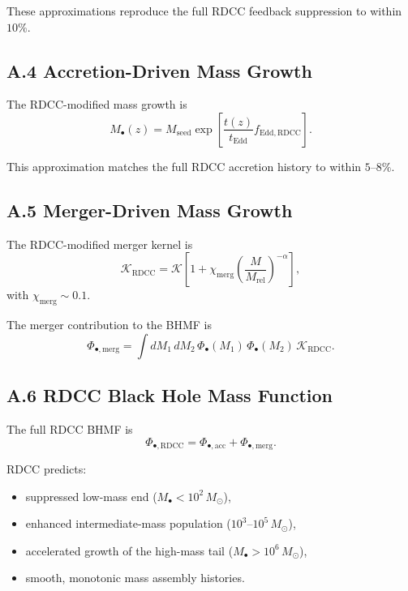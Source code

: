 \documentclass[11pt,a4paper]{article}
\begin{document}
These approximations reproduce the full RDCC feedback suppression to within $10\%$.

\subsection*{A.4 Accretion-Driven Mass Growth}

The RDCC-modified mass growth is
\begin{equation}
    M_{\bullet}(z)
    = M_{\mathrm{seed}}
      \exp\!\left[
        \frac{t(z)}{t_{\mathrm{Edd}}}
        f_{\mathrm{Edd,RDCC}}
      \right].
\end{equation}

This approximation matches the full RDCC accretion history to within $5$–$8\%$.

\subsection*{A.5 Merger-Driven Mass Growth}

The RDCC-modified merger kernel is
\begin{equation}
    \mathcal{K}_{\mathrm{RDCC}}
    = \mathcal{K}
      \left[
        1 + \chi_{\mathrm{merg}}
        \left(\frac{M}{M_{\mathrm{rel}}}\right)^{-\alpha}
      \right],
\end{equation}
with $\chi_{\mathrm{merg}} \sim 0.1$.

The merger contribution to the BHMF is
\begin{equation}
    \Phi_{\bullet,\mathrm{merg}}
    = \int dM_{1}\, dM_{2}\,
      \Phi_{\bullet}(M_{1})\,
      \Phi_{\bullet}(M_{2})\,
      \mathcal{K}_{\mathrm{RDCC}}.
\end{equation}

\subsection*{A.6 RDCC Black Hole Mass Function}

The full RDCC BHMF is
\begin{equation}
    \Phi_{\bullet,\mathrm{RDCC}}
    = \Phi_{\bullet,\mathrm{acc}}
    + \Phi_{\bullet,\mathrm{merg}}.
\end{equation}

RDCC predicts:

\begin{itemize}
    \item suppressed low-mass end ($M_{\bullet} < 10^{2}\,M_{\odot}$),
    \item enhanced intermediate-mass population ($10^{3}$–$10^{5}\,M_{\odot}$),
    \item accelerated growth of the high-mass tail ($M_{\bullet} > 10^{6}\,M_{\odot}$),
    \item smooth, monotonic mass assembly histories.
\end{itemize}
\end{document}
